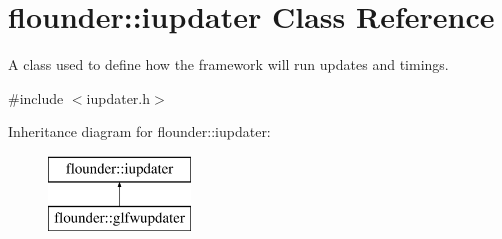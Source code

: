 \hypertarget{classflounder_1_1iupdater}{}\section{flounder\+:\+:iupdater Class Reference}
\label{classflounder_1_1iupdater}


A class used to define how the framework will run updates and timings.  




{\ttfamily \#include $<$iupdater.\+h$>$}

Inheritance diagram for flounder\+:\+:iupdater\+:\begin{figure}[H]
\begin{center}
\leavevmode
\includegraphics[height=2.000000cm]{classflounder_1_1iupdater}
\end{center}
\end{figure}
